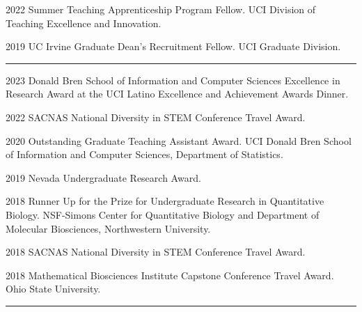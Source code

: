 \documentclass{article}
\begin{document}
	
	
	
	\begin{description}
		\vspace{-2mm}
		\item[Fellowships]\hspace*{.1in}
		
		2022 Summer Teaching Apprenticeship Program Fellow. UCI Division of Teaching Excellence and Innovation.
		\vspace*{1mm}
		
		2019 UC Irvine Graduate Dean's Recruitment Fellow. UCI Graduate Division.
		
	\end{description}
	\vspace{-2mm}
	\rule{\linewidth}{1pt}
	
	
	
	\begin{description}
		\vspace{-2mm}
		\item[Awards]\hspace*{.1in}
		
		2023 Donald Bren School of Information and Computer Sciences Excellence in Research Award at the UCI Latino Excellence and Achievement Awards Dinner.
		\vspace*{1mm}
		
		2022 SACNAS National Diversity in STEM Conference Travel Award.
		\vspace*{1mm}
		
		2020 Outstanding Graduate Teaching Assistant Award. UCI Donald Bren School of Information and Computer Sciences, Department of Statistics.
		\vspace*{1mm}
		
		2019 Nevada Undergraduate Research Award.
		\vspace*{1mm}
		
		2018 Runner Up for the Prize for Undergraduate Research in Quantitative Biology. NSF-Simons Center for Quantitative Biology and Department of Molecular Biosciences, Northwestern University.
		\vspace*{1mm}
		
		2018 SACNAS National Diversity in STEM Conference Travel Award.
		\vspace*{1mm}
		
		2018 Mathematical Biosciences Institute Capstone Conference Travel Award. Ohio State University.
		
	\end{description}
	\vspace{-2mm}
	\rule{\linewidth}{1pt}
	
\end{document}
